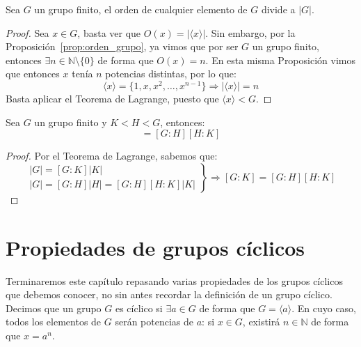 \begin{coro}
    Sea $G$ un grupo finito, el orden de cualquier elemento de $G$ divide a $|G|$.
    \begin{proof}
        Sea $x\in G$, basta ver que $O(x) = |\langle x \rangle |$. Sin embargo, por la Proposición~\ref{prop:orden_grupo}, ya vimos que por ser $G$ un grupo finito, entonces $\exists n\in \mathbb{N}\setminus\{0\}$ de forma que $O(x) = n$. En esta misma Proposición vimos que entonces $x$ tenía $n$ potencias distintas, por lo que:
        \begin{equation*}
            \langle x \rangle  = \{1,x,x^2,\ldots,x^{n-1}\} \Longrightarrow |\langle x \rangle | = n
        \end{equation*}
        Basta aplicar el Teorema de Lagrange, puesto que $\langle x \rangle < G$.
    \end{proof}
\end{coro}

\begin{coro}
    Sea $G$ un grupo finito y $K < H < G$, entonces:
    \begin{equation*}
        [G:K] = [G:H][H:K]
    \end{equation*}
    \begin{proof}
        Por el Teorema de Lagrange, sabemos que:
        \begin{equation*}
            \left.\begin{array}{r}
                    |G| = [G:K]|K| \\
                    |G| = [G:H]|H| = [G:H][H:K]|K|
            \end{array}\right\} \Longrightarrow [G:K] = [G:H][H:K]
        \end{equation*}
    \end{proof}
\end{coro}

\section{Propiedades de grupos cíclicos}
Terminaremos este capítulo repasando varias propiedades de los grupos cíclicos que debemos conocer, no sin antes recordar la definición de un grupo cíclico. Decimos que un grupo $G$ es cíclico si $\exists a\in G$ de forma que $G = \langle a \rangle $. En cuyo caso, todos los elementos de $G$ serán potencias de $a$: si $x\in G$, existirá $n\in \mathbb{N}$ de forma que $x=a^n$.\\

